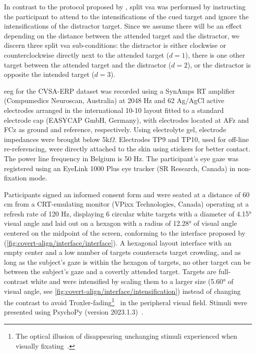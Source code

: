 In contrast to the protocol proposed by \textcite{Frenzel2011}, split \ac{vsa} was
performed by instructing the participant to attend to the intensifications of the
cued target and ignore the intensifications of the distractor target.
Since we assume there will be an effect depending on the distance between
the attended target and the distractor, we discern three split \ac{vsa} sub-conditions:
the distractor is either clockwise or counterclockwise directly next to the
attended target ($d=1$), there is one other target between the attended target and
the distractor ($d=2$), or the distractor is opposite the intended target
($d=3$).

\ac{eeg} for the CVSA-ERP dataset was recorded using a SynAmps RT amplifier
(Compumedics Neuroscan, Australia) at 2048 Hz and 62 Ag/AgCl active electrodes arranged in the
international 10-10 layout fitted to a standard electrode cap (EASYCAP GmbH,
Germany), with electrodes located at AFz and FCz as ground and reference, respectively.
Using electrolyte gel, electrode impedances were brought below 5k$\Omega$.
Electrodes TP9 and TP10, used for off-line re-referencing, were directly
attached to the skin using stickers for better contact.
The power line frequency in Belgium is 50 Hz.
The participant's eye gaze was registered using an EyeLink 1000 Plus eye tracker (SR Research,
Canada) in non-fixation mode.

Participants signed an informed consent form and were seated at a distance of
60 cm from a CRT-emulating monitor (VPixx
Technologies, Canada) operating at a refresh rate of 120 Hz, displaying 6
circular white targets with a diameter of 4.15° visual angle and laid out on a hexagon
with a radius of 12.28° of visual angle centered on the midpoint of the screen,
conforming to the interface proposed by \textcite{Treder2010}
(\cref{fig:covert-align/interface/interface}).
A hexagonal layout interface with an empty center and a low number of targets
counteracts target crowding, and as long as the subject’s gaze is within the hexagon of
targets, no other target can be between the subject’s gaze and a covertly
attended target.
Targets are full-contrast white and were intensified by scaling them to a
larger size (5.60° of visual angle, see \cref{fig:covert-align/interface/intensification})
instead of changing the contrast to avoid Troxler-fading\footnote{The optical illusion of disappearing unchanging stimuli
experienced when visually fixating~\cite{Troxler1804}.}~\cite{Treder2010} in the
peripheral visual field.
Stimuli were presented using PsychoPy (version 2023.1.3)~\cite{Peirce2019}.

